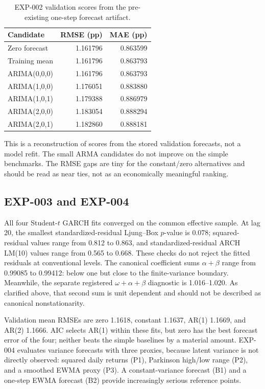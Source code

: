 \documentclass[11pt,a4paper]{article}
\begin{document}
\begin{table}[htbp]
\centering\small
\caption{EXP-002 validation scores from the pre-existing one-step forecast artifact.}
\label{tab:arima-validation}
\begin{tabular}{lrr}
\toprule
Candidate & RMSE (pp) & MAE (pp)\\
\midrule
Zero forecast & 1.161796 & 0.863599\\
Training mean & 1.161796 & 0.863793\\
ARIMA(0,0,0) & 1.161796 & 0.863793\\
ARIMA(1,0,0) & 1.176051 & 0.883880\\
ARIMA(1,0,1) & 1.179388 & 0.886979\\
ARIMA(2,0,0) & 1.183054 & 0.888294\\
ARIMA(2,0,1) & 1.182860 & 0.888181\\
\bottomrule
\end{tabular}
\end{table}
This is a reconstruction of scores from the stored validation forecasts, not a model refit. The
small ARMA candidates do not improve on the simple benchmarks. The RMSE gaps are tiny for the
constant/zero alternatives and should be read as near ties, not as an economically meaningful
ranking.

\subsection{EXP-003 and EXP-004}
All four Student-$t$ GARCH fits converged on the common effective sample. At lag 20, the smallest
standardized-residual Ljung--Box $p$-value is 0.078; squared-residual values range from 0.812 to
0.863, and standardized-residual ARCH LM(10) values range from 0.565 to 0.668. These checks do
not reject the fitted residuals at conventional levels. The canonical coefficient sums
$\alpha+\beta$ range from 0.99085 to 0.99412: below one but close to the finite-variance
boundary. Meanwhile, the separate registered $\omega+\alpha+\beta$ diagnostic is 1.016--1.020.
As clarified above, that second sum is unit dependent and should not be described as canonical
nonstationarity.

Validation mean RMSEs are zero 1.1618, constant 1.1637, AR(1) 1.1669, and AR(2) 1.1666. AIC
selects AR(1) within these fits, but zero has the best forecast error of the four; neither beats
the simple baselines by a material amount. EXP-004 evaluates variance forecasts with three
proxies, because latent variance is not directly observed: squared daily returns (P1), Parkinson
high/low range (P2), and a smoothed EWMA proxy (P3). A constant-variance forecast (B1) and a
one-step EWMA forecast (B2) provide increasingly serious reference points.
\end{document}
